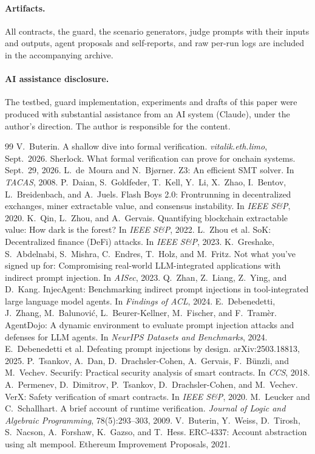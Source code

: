 \documentclass[11pt]{article}
\begin{document}
\paragraph{Artifacts.} All contracts, the guard, the scenario generators, judge prompts with their inputs and outputs, agent proposals and self-reports, and raw per-run logs are included in the accompanying archive.

\paragraph{AI assistance disclosure.} The testbed, guard implementation, experiments and drafts of this paper were produced with substantial assistance from an AI system (Claude), under the author's direction. The author is responsible for the content.

\small
\begin{thebibliography}{99}
 V.~Buterin. A shallow dive into formal verification. \emph{vitalik.eth.limo}, Sept.~2026.
 Sherlock. What formal verification can prove for onchain systems. Sept.~29, 2026.
 L.~de~Moura and N.~Bj{\o}rner. Z3: An efficient SMT solver. In \emph{TACAS}, 2008.
 P.~Daian, S.~Goldfeder, T.~Kell, Y.~Li, X.~Zhao, I.~Bentov, L.~Breidenbach, and A.~Juels. Flash Boys 2.0: Frontrunning in decentralized exchanges, miner extractable value, and consensus instability. In \emph{IEEE S\&P}, 2020.
 K.~Qin, L.~Zhou, and A.~Gervais. Quantifying blockchain extractable value: How dark is the forest? In \emph{IEEE S\&P}, 2022.
 L.~Zhou et al. SoK: Decentralized finance (DeFi) attacks. In \emph{IEEE S\&P}, 2023.
 K.~Greshake, S.~Abdelnabi, S.~Mishra, C.~Endres, T.~Holz, and M.~Fritz. Not what you've signed up for: Compromising real-world LLM-integrated applications with indirect prompt injection. In \emph{AISec}, 2023.
 Q.~Zhan, Z.~Liang, Z.~Ying, and D.~Kang. InjecAgent: Benchmarking indirect prompt injections in tool-integrated large language model agents. In \emph{Findings of ACL}, 2024.
 E.~Debenedetti, J.~Zhang, M.~Balunovi\'c, L.~Beurer-Kellner, M.~Fischer, and F.~Tram\`er. AgentDojo: A dynamic environment to evaluate prompt injection attacks and defenses for LLM agents. In \emph{NeurIPS Datasets and Benchmarks}, 2024.
 E.~Debenedetti et al. Defeating prompt injections by design. arXiv:2503.18813, 2025.
 P.~Tsankov, A.~Dan, D.~Drachsler-Cohen, A.~Gervais, F.~B\"unzli, and M.~Vechev. Securify: Practical security analysis of smart contracts. In \emph{CCS}, 2018.
 A.~Permenev, D.~Dimitrov, P.~Tsankov, D.~Drachsler-Cohen, and M.~Vechev. VerX: Safety verification of smart contracts. In \emph{IEEE S\&P}, 2020.
 M.~Leucker and C.~Schallhart. A brief account of runtime verification. \emph{Journal of Logic and Algebraic Programming}, 78(5):293--303, 2009.
 V.~Buterin, Y.~Weiss, D.~Tirosh, S.~Nacson, A.~Forshaw, K.~Gazso, and T.~Hess. ERC-4337: Account abstraction using alt mempool. Ethereum Improvement Proposals, 2021.
\end{thebibliography}
\end{document}
